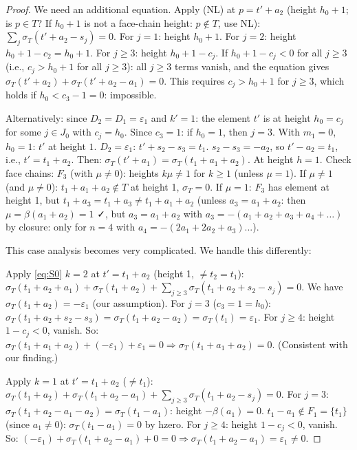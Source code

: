 \begin{proof}
  We need an additional equation.  Apply (NL) at $p = t'+a_2$ (height $h_0+1$; is $p\in T$?
  If $h_0+1$ is not a face-chain height: $p\notin T$, use NL):
  $\sum_j \sigma_T(t'+a_2-s_j)=0$.
  For $j=1$: height $h_0+1$. For $j=2$: height $h_0+1-c_2=h_0+1$. For $j\geq 3$: height $h_0+1-c_j$.
  If $h_0+1-c_j<0$ for all $j\geq 3$ (i.e., $c_j>h_0+1$ for all $j\geq 3$):
  all $j\geq 3$ terms vanish, and the equation gives $\sigma_T(t'+a_2)+\sigma_T(t'+a_2-a_1)=0$.
  This requires $c_j>h_0+1$ for $j\geq 3$, which holds if $h_0<c_3-1=0$: impossible.

  Alternatively: since $D_2=D_1=\varepsilon_1$ and $k'=1$: the element $t'$ is at height $h_0=c_j$
  for some $j\in J_0$ with $c_j=h_0$.  Since $c_3=1$: if $h_0=1$, then $j=3$.
  With $m_1=0$, $h_0=1$: $t'$ at height $1$.  $D_2=\varepsilon_1$: $t'+s_2-s_3=t_1$.
  $s_2-s_3=-a_2$, so $t'-a_2=t_1$, i.e., $t'=t_1+a_2$.
  Then: $\sigma_T(t'+a_1)=\sigma_T(t_1+a_1+a_2)$.  At height $h=1$.  Check face chains:
  $F_3$ (with $\mu\neq 0$): heights $k\mu\neq 1$ for $k\geq 1$ (unless $\mu=1$).
  If $\mu\neq 1$ (and $\mu\neq 0$): $t_1+a_1+a_2\notin T$ at height 1, $\sigma_T=0$.
  If $\mu=1$: $F_3$ has element at height 1, but $t_1+a_3 = t_1+a_3\neq t_1+a_1+a_2$
  (unless $a_3=a_1+a_2$: then $\mu=\beta(a_1+a_2)=1$ ✓, but $a_3=a_1+a_2$ with
  $a_3=-(a_1+a_2+a_3+a_4+\ldots)$ by closure: only for $n=4$ with $a_4=-(2a_1+2a_2+a_3)$...).

  This case analysis becomes very complicated.  We handle this differently:

  Apply \eqref{eq:S0} $k=2$ at $t' = t_1+a_2$ (height 1, $\neq t_2=t_1$):
  $\sigma_T(t_1+a_2+a_1)+\sigma_T(t_1+a_2)+\sum_{j\geq 3}\sigma_T(t_1+a_2+s_2-s_j)=0$.
  We have $\sigma_T(t_1+a_2)=-\varepsilon_1$ (our assumption).
  For $j=3$ ($c_3=1=h_0$): $\sigma_T(t_1+a_2+s_2-s_3)=\sigma_T(t_1+a_2-a_2)=\sigma_T(t_1)=\varepsilon_1$.
  For $j\geq 4$: height $1-c_j<0$, vanish.
  So: $\sigma_T(t_1+a_1+a_2)+(-\varepsilon_1)+\varepsilon_1=0\Rightarrow\sigma_T(t_1+a_1+a_2)=0$.  (Consistent with our finding.)

  Apply $k=1$ at $t' = t_1+a_2$ ($\neq t_1$):
  $\sigma_T(t_1+a_2)+\sigma_T(t_1+a_2-a_1)+\sum_{j\geq 3}\sigma_T(t_1+a_2-s_j)=0$.
  For $j=3$: $\sigma_T(t_1+a_2-a_1-a_2)=\sigma_T(t_1-a_1)$: height $-\beta(a_1)=0$.
  $t_1-a_1\notin F_1=\{t_1\}$ (since $a_1\neq 0$): $\sigma_T(t_1-a_1)=0$ by hzero.
  For $j\geq 4$: height $1-c_j<0$, vanish.
  So: $(-\varepsilon_1)+\sigma_T(t_1+a_2-a_1)+0=0\Rightarrow\sigma_T(t_1+a_2-a_1)=\varepsilon_1\neq 0$.


\end{proof}
